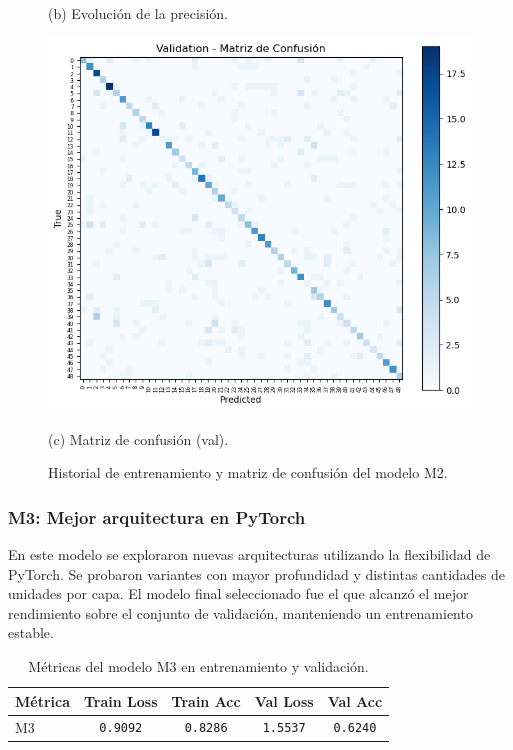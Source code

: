 \documentclass[11pt]{article}
\begin{document}
\begin{figure}[H]
\begin{minipage}[t]{0.32\textwidth}
        \caption*{(b) Evolución de la precisión.}
    \end{minipage}
    \hfill
    \begin{minipage}[t]{0.32\textwidth}
        \centering
        \includegraphics[width=\linewidth]{figures/conf_matrix_m2.png}
        \caption*{(c) Matriz de confusión (val).}
    \end{minipage}
    \caption{Historial de entrenamiento y matriz de confusión del modelo M2.}
    \label{fig:plots-m2}
\end{figure}

\subsubsection*{M3: Mejor arquitectura en PyTorch}

En este modelo se exploraron nuevas arquitecturas utilizando la flexibilidad de PyTorch. Se probaron variantes con mayor profundidad y distintas cantidades de unidades por capa. El modelo final seleccionado fue el que alcanzó el mejor rendimiento sobre el conjunto de validación, manteniendo un entrenamiento estable.

\begin{table}[H]
    \centering
    \begin{tabular}{lcccc}
        \hline
        Métrica & Train Loss & Train Acc & Val Loss & Val Acc \\
        \hline
        M3 & \texttt{0.9092} & \texttt{0.8286} & \texttt{1.5537} & \texttt{0.6240} \\
        \hline
    \end{tabular}
    \caption{Métricas del modelo M3 en entrenamiento y validación.}
    \label{tab:metrics-m3}
\end{table}
\end{document}
